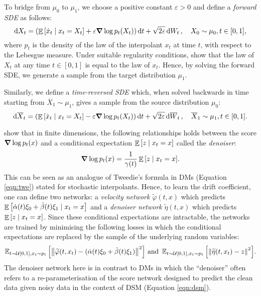 To bridge from \(\mu_{0}\) to \(\mu_{1}\), we choose a positive constant \(\varepsilon > 0\) and define a \textit{forward SDE} as follows:
\begin{equation}
  \dd{X_{t}} = \qty(\mathop{\mathbb{E}}\qty[\dot{x}_{t} \mid x_{t} = X_{t}] + \varepsilon \grad \log p_{t}(X_{t}))\dd{t} + \sqrt{2\varepsilon} \dd{W_{t}}, \quad X_{0} \sim \mu_{0}, t \in [0, 1], \label{eqn:sif}
\end{equation}
where \(p_{t}\) is the density of the law of the interpolant \(x_{t}\) at time \(t\), with respect to the Lebesgue measure. Under suitable regularity conditions, \citet{albergo2023stochasticinterpolantsunifyingframework} show that the law of \(X_{t}\) at any time \(t \in [0, 1]\) is equal to the law of \(x_{t}\). Hence, by solving the forward SDE, we generate a sample from the target distribution \(\mu_{1}\). %

Similarly, we define a \textit{time-reversed SDE} which, when solved backwards in time starting from \(\overline{X}_{1} \sim \mu_{1}\), gives a sample from the source distribution \(\mu_{0}\):
\begin{equation}
  \dd{ \overline{X}_{t}} = \qty(\mathop{\mathbb{E}}\qty[\dot{x}_{t} \mid x_{t} = X_{t}] - \varepsilon \grad \log p_{t}(X_{t}))\dd{t} + \sqrt{2\varepsilon} \dd{ \overline{W}_{t}}, \quad \overline{X}_{1} \sim \mu_{1}, t \in [0, 1].\label{eqn:sib}
\end{equation}

\citet[Theorem 2.8]{albergo2023stochasticinterpolantsunifyingframework} show that in finite dimensions, the following relationships holds between the score \(\grad \log p_{t}(x)\) and a conditional expectation \(\mathop{\mathbb{E}}\qty[z \mid x_{t} = x]\) called the \textit{denoiser}:
\[
  \grad \log p_{t}(x) = \frac{1}{\gamma(t)} \mathop{\mathbb{E}}\qty[z \mid x_{t} = x].
\]
This can be seen as an analogue of Tweedie's formula in DMs (Equation \ref{eqn:twe}) stated for stochastic interpolants. Hence, to learn the drift coefficient, one can define two networks: a \textit{velocity network} \(\widetilde{\varphi}(t, x)\) which predicts \(\mathop{\mathbb{E}}\qty[\dot{\alpha}(t)\xi_{0} + \dot{\beta}(t)\xi_{1} \mid x_{t} = x]\) and a \textit{denoiser network} \(\widetilde{\eta}(t, x)\) which predicts \(\mathop{\mathbb{E}}\qty[z \mid x_{t} = x]\). Since these conditional expectations are intractable, the networks are trained by minimising the following losses in which the conditional expectations are replaced by the sample of the underlying random variables:
\[
  \mathop{\mathbb{E}_{t \sim \mathcal{U}[0, 1], x_{t} \sim p_{t}}}\qty[ \norm{\widetilde{\varphi}(t, x_{t}) - (\dot{\alpha}(t)\xi_{0} + \dot{\beta}(t)\xi_{1})}^{2} ] \text{ and } \mathop{\mathbb{E}_{t \sim \mathcal{U}[0, 1], x_{t} \sim p_{t}}}\qty[\norm{\widetilde{\eta}(t, x_{t}) - z}^{2}].
\]
The denoiser network here is in contrast to DMs in which the ``denoiser'' often refers to a re-parameterisation of the score network designed to predict the clean data given noisy data in the context of DSM (Equation \ref{eqn:dsm}).

